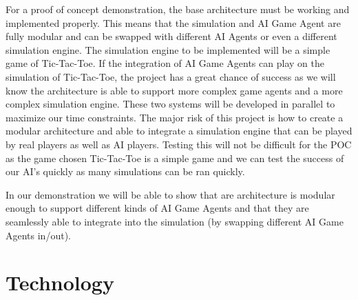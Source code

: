 \documentclass{article}
\begin{document}
For a proof of concept demonstration, the base architecture must be working and implemented properly. This means that the simulation and AI Game Agent are fully
modular and can be swapped with different AI Agents or even a different simulation engine. The simulation engine to be implemented will be a simple game of Tic-Tac-Toe.
If the integration of AI Game Agents can play on the simulation of Tic-Tac-Toe, the project has a great chance of success as we will know the architecture is able to support
more complex game agents and a more complex simulation engine. These two systems will be developed in parallel to maximize our time constraints.
The major risk of this project is how to create a modular architecture and able to integrate a simulation engine that can be played by real players as well as AI players. Testing this will not be difficult for the POC as the game chosen Tic-Tac-Toe is a simple game and we can test the success of our AI's quickly as many simulations can be ran quickly.

In our demonstration we will be able to show that are architecture is modular enough to support different kinds of AI Game Agents and that they are seamlessly able to integrate into the simulation (by swapping different AI Game Agents in/out).
\section{Technology}
\end{document}
